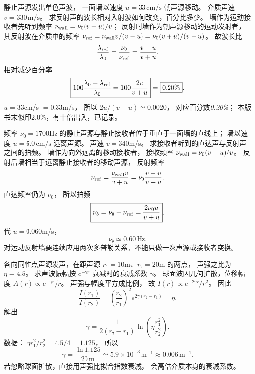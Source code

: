 静止声源发出单色声波，
一面墙以速度
$u=33\,\mathrm{cm/s}$ 朝声源移动。
介质声速
$v=330\,\mathrm{m/s}$。
求反射声的波长相对入射波如何改变，百分比多少。
\exsolution
墙作为运动接收者先听到频率
$\nu_{\rm wall}=\nu_0(v+u)/v$；
反射时墙作为朝声源移动的运动发射者，
其反射波在介质中的频率
$\nu_{\rm ref}=\nu_{\rm wall}v/(v-u)
=\nu_0(v+u)/(v-u)$。
故波长比
\[
\frac{\lambda_{\rm ref}}{\lambda_0}
=\frac{\nu_0}{\nu_{\rm ref}}
=\frac{v-u}{v+u}.
\]
相对减少百分率
\[
\boxed{100\frac{\lambda_0-\lambda_{\rm ref}}
{\lambda_0}=100\frac{2u}{v+u}}
=\boxed{0.20\%}.
\]
\excheck $u=33$cm/s $=0.33$m/s，
所以 $2u/(v+u)\simeq0.0020$，
对应百分数\emph{0.20\%}；
本版书末似印2.0\%，有十倍出入，已记录。

频率 $\nu_0=1700$Hz 的静止声源与静止接收者位于垂直于一面墙的直线上；
墙以速度
$u=6.0\,\mathrm{cm/s}$ 远离声源。
声速 $v=340$m/s。
求接收者听到的直达声与反射声之间的拍频。
\exsolution
墙作为向外远离的移动接收者，
接收频率
$\nu_{\rm wall}=\nu_0(v-u)/v$。
反射后墙相当于远离静止接收者的移动声源，
反射频率
\[
\nu_{\rm ref}=\frac{\nu_{\rm wall}v}{v+u}
=\nu_0\frac{v-u}{v+u}.
\]
直达频率仍为 $\nu_0$，
所以拍频
\[
\boxed{\nu_b=\nu_0-\nu_{\rm ref}
=\frac{2\nu_0u}{v+u}}.
\]
代 $u=0.060$m/s，
\[
\boxed{\nu_b\simeq0.60\,\mathrm{Hz}}.
\]
\excheck 对运动反射墙要连续应用两次多普勒关系，不能只做一次声源或接收者变换。

各向同性点声源发声，在距声源
$r_1=10$m、$r_2=20$m 的两点，
声强之比为
$\eta=4.5$。
求声波振幅按
$e^{-\gamma r}$ 衰减时的衰减系数 $\gamma$。
\exsolution
球面波因几何扩散，位移幅度
$A(r)\propto e^{-\gamma r}/r$。
声强与幅度平方成比例，
故
$I(r)\propto e^{-2\gamma r}/r^2$。
因此
\[
\frac{I(r_1)}{I(r_2)}
=\left(\frac{r_2}{r_1}\right)^2
e^{2\gamma(r_2-r_1)}
=\eta.
\]
解出
\[
\boxed{\gamma=\frac1{2(r_2-r_1)}
\ln\left(\eta\frac{r_1^2}{r_2^2}\right)}.
\]
数据：
$\eta r_1^2/r_2^2=4.5/4=1.125$，
所以
\[
\boxed{\gamma=\frac{\ln1.125}{20\,\mathrm m}
\simeq5.9\times10^{-3}\,\mathrm{m^{-1}}
\approx0.006\,\mathrm{m^{-1}}}.
\]
\excheck 若忽略球面扩散，直接用声强比拟合指数衰减，
会高估介质本身的衰减系数。
